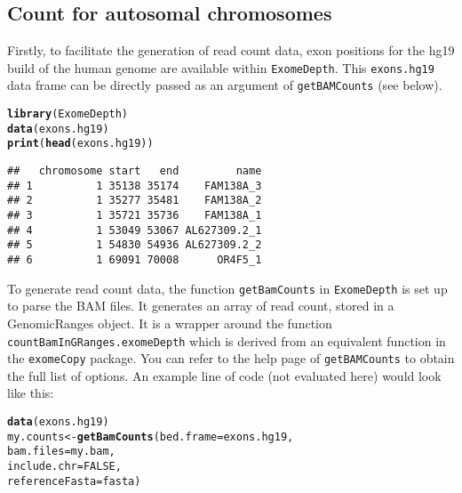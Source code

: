 \documentclass[10pt]{article}\usepackage[]{graphicx}\usepackage[]{color}
\makeatletter
\newcommand{\hlnum}[1]{\textcolor[rgb]{0.686,0.059,0.569}{#1}}%
\newcommand{\hlstd}[1]{\textcolor[rgb]{0.345,0.345,0.345}{#1}}%
\newcommand{\hlkwb}[1]{\textcolor[rgb]{0.69,0.353,0.396}{#1}}%
\newcommand{\hlkwc}[1]{\textcolor[rgb]{0.333,0.667,0.333}{#1}}%
\newcommand{\hlkwd}[1]{\textcolor[rgb]{0.737,0.353,0.396}{\textbf{#1}}}%
\newenvironment{kframe}{%
 \def\at@end@of@kframe{}%
 \ifinner\ifhmode%
  \def\at@end@of@kframe{\end{minipage}}%
  \begin{minipage}{\columnwidth}%
 \fi\fi%
 \def\FrameCommand##1{\hskip\@totalleftmargin \hskip-\fboxsep
 \colorbox{shadecolor}{##1}\hskip-\fboxsep
     \hskip-\linewidth \hskip-\@totalleftmargin \hskip\columnwidth}%
 \MakeFramed {\advance\hsize-\width
   \@totalleftmargin\z@ \linewidth\hsize
   \@setminipage}}%
 {\par\unskip\endMakeFramed%
 \at@end@of@kframe}
\newenvironment{knitrout}{}{} %
\makeatother
\begin{document}
\subsection{Count for autosomal chromosomes}
Firstly, to facilitate the generation of read count data,  exon positions for the hg19 build of the human genome are available within \texttt{ExomeDepth}.
This \texttt{exons.hg19} data frame can be directly passed as an argument of \texttt{getBAMCounts} (see below).

\begin{knitrout}
\color{fgcolor}\begin{kframe}
\begin{alltt}
\hlkwd{library}\hlstd{(ExomeDepth)}
\hlkwd{data}\hlstd{(exons.hg19)}
\hlkwd{print}\hlstd{(}\hlkwd{head}\hlstd{(exons.hg19))}
\end{alltt}
\begin{verbatim}
##   chromosome start   end         name
## 1          1 35138 35174    FAM138A_3
## 2          1 35277 35481    FAM138A_2
## 3          1 35721 35736    FAM138A_1
## 4          1 53049 53067 AL627309.2_1
## 5          1 54830 54936 AL627309.2_2
## 6          1 69091 70008      OR4F5_1
\end{verbatim}
\end{kframe}
\end{knitrout}


To generate read count data, the function \texttt{getBamCounts} in \texttt{ExomeDepth} is set up to parse the BAM files. 
It generates an array of read count, stored in a GenomicRanges object.
It is a wrapper around the function \texttt{countBamInGRanges.exomeDepth} which is derived from an equivalent function in the \texttt{exomeCopy} package.
You can refer to the help page of \texttt{getBAMCounts} to obtain the full list of options. 
An example line of code (not evaluated here) would look like this:

\begin{knitrout}
\color{fgcolor}\begin{kframe}
\begin{alltt}
\hlkwd{data}\hlstd{(exons.hg19)}
\hlstd{my.counts} \hlkwb{<-} \hlkwd{getBamCounts}\hlstd{(}\hlkwc{bed.frame} \hlstd{= exons.hg19,}
                          \hlkwc{bam.files} \hlstd{= my.bam,}
                          \hlkwc{include.chr} \hlstd{=} \hlnum{FALSE}\hlstd{,}
                          \hlkwc{referenceFasta} \hlstd{= fasta)}
\end{alltt}
\end{kframe}
\end{knitrout}
\end{document}
